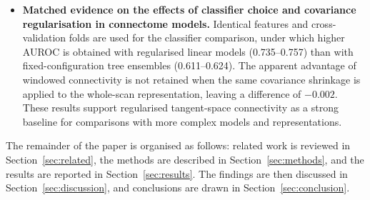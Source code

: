 \begin{itemize}
\item \textbf{Matched evidence on the effects of classifier choice and covariance regularisation in connectome models.} Identical features and cross-validation folds are used for the classifier comparison, under which higher AUROC is obtained with regularised linear models (0.735--0.757) than with fixed-configuration tree ensembles (0.611--0.624). The apparent advantage of windowed connectivity is not retained when the same covariance shrinkage is applied to the whole-scan representation, leaving a difference of $-0.002$. These results support regularised tangent-space connectivity as a strong baseline for comparisons with more complex models and representations.

\end{itemize}
The remainder of the paper is organised as follows: related work is reviewed in
Section~\ref{sec:related}, the methods are described in
Section~\ref{sec:methods}, and the results are reported in Section~\ref{sec:results}.
The findings are then discussed in Section~\ref{sec:discussion}, and conclusions are drawn in
Section~\ref{sec:conclusion}.
